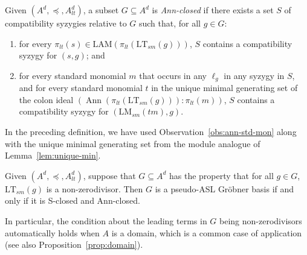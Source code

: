 \documentclass[11pt,reqno]{amsart}
\DeclareMathOperator{\Ann}{Ann}
\newcommand{\lmsm}{\text{LM}_{sm}}
\newcommand{\ltsm}{\text{LT}_{sm}}
\newcommand{\piltd}{\pi_{lt}}
\newcommand{\LAM}{\ensuremath{\text{LAM}}}
\theoremstyle{definition}
\numberwithin{equation}{section}
\begin{document}
\begin{definition}[store=defannclosed,note={Ann-closed}] 
\label{def:ann-closed}
Given $(A^d, \preceq, A_{lt}^d)$, a subset $G \subseteq A^d$ is \emph{Ann-closed} if there exists a set $S$ of compatibility syzygies relative to $G$ such that, for all $g \in G$: 
\begin{enumerate}
\item \label{def:ann-closed1}for every $\pi_{lt}(s) \in \LAM(\piltd(\ltsm(g)))$, $S$ contains a compatibility syzygy for $(s,g)$; and

\item \label{def:ann-closed2}for every standard monomial $m$ that occurs in any $\ell_g$ in any syzygy in $S$, and for every standard monomial $t$ in the unique minimal generating set of the colon ideal $(\Ann(\piltd(\ltsm(g))) : \pi_{lt}(m))$, $S$ contains a compatibility syzygy for $(\lmsm(tm), g)$.
\end{enumerate}
\end{definition}
In the preceding definition, we have used Observation~\ref{obs:ann-std-mon} along with the unique minimal generating set from the module analogue of Lemma~\ref{lem:unique-min}.

\begin{theorem}[store=thmaslbuchberger2, note={Pseudo-ASL analogue of Buchberger's criterion}] 
\label{thm:buchberger2}
Given $(A^d, \preceq, A_{lt}^d)$, suppose that $G \subseteq A^d$ has the property that for all $g \in G$, $\ltsm(g)$ is a non-zerodivisor. Then $G$ is a pseudo-ASL Gröbner basis if and only if it is S-closed and Ann-closed.
\end{theorem}

In particular, the condition about the leading terms in $G$ being non-zerodivisors automatically holds when $A$ is a domain, which is a common case of application (see also Proposition~\ref{prop:domain}).
\end{document}
